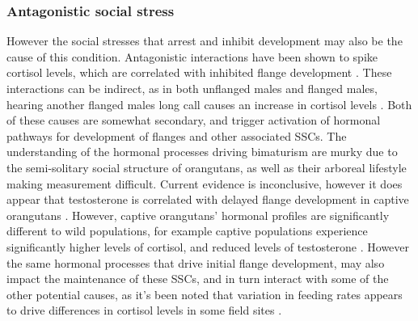 \subsubsection{Antagonistic social stress}
However the social stresses that arrest and inhibit development may also be the cause of this condition. Antagonistic interactions have been shown to spike cortisol levels, which are correlated with inhibited flange development \citep{Thompson.2012}. These interactions can be indirect, as in both unflanged males and flanged males, hearing another flanged males long call causes an increase in cortisol levels \citep{Prasetyo.2021}. Both of these causes are somewhat secondary, and trigger activation of hormonal pathways for development of flanges and other associated SSCs. The understanding of the hormonal processes driving bimaturism are murky due to the semi-solitary social structure of orangutans, as well as their arboreal lifestyle making measurement difficult. Current evidence is inconclusive, however it does appear that testosterone is correlated with delayed flange development in captive orangutans \citep{Thompson.2012, Muller.2017}. However, captive orangutans' hormonal profiles are significantly different to wild populations, for example captive populations experience significantly higher levels of cortisol, and reduced levels of testosterone \citep{Prasetyo.2021}. However the same hormonal processes that drive initial flange development, may also impact the maintenance of these SSCs, and in turn interact with some of the other potential causes, as it's been noted that variation in feeding rates appears to drive differences in cortisol levels in some field sites \citep{Prasetyo.2021}.

